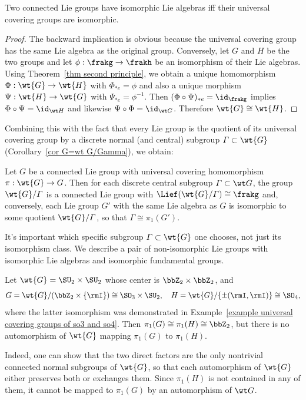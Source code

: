 \begin{thm}[{{\cite[Thm.~9.5.13]{HN}}}]
    Two connected Lie groups have isomorphic Lie algebras iff their universal covering groups are isomorphic.
\end{thm}
\begin{proof}
    The backward implication is obvious because the universal covering group has the same Lie algebra as the original group. Conversely, let $G$ and $H$ be the two groups and let $\phi:\frakg\to \frakh$ be an isomorphism of their Lie algebras. Using Theorem~\ref{thm second principle}, we obtain a unique homomorphism $\Phi:\wt{G}\to \wt{H}$ with $\Phi_{\ast e}=\phi$ and also a unique morphism $\Psi:\wt{H}\to \wt{G}$ with $\Psi_{\ast e}=\phi^{-1}$. Then $(\Phi\circ\Psi)_{\ast e}=\id_{\frakg}$ implies  $\Phi\circ\Psi=\id_{\wt H}$ and likewise $\Psi\circ\Phi=\id_{\wt G}$. Therefore $\wt{G}\cong \wt{H}$.
\end{proof}
Combining this with the fact that every Lie group is the quotient of its universal covering group by a discrete normal (and central) subgroup $\varGamma\subset \wt{G}$ (Corollary~\ref{cor G=wt G/Gamma}), we obtain:

\begin{cor}
    Let $G$ be a connected Lie group with universal covering homomorphism $\pi:\wt{G}\to G$. Then for each discrete central subgroup $\varGamma\subset \wt G$, the group $\wt{G}\slash\varGamma$ is a connected Lie group with $\Lief (\wt{G}\slash \varGamma)\cong \frakg$  and, conversely, each Lie group $G'$ with the same Lie algebra as $G$ is isomorphic to some quotient $\wt{G}\slash \varGamma$, so that $\varGamma\cong \pi_1(G')$.
\end{cor}

\begin{example}
    It's important which specific subgroup $\varGamma\subset \wt{G}$ one chooses, not just its isomorphism class.
    We describe a pair of non-isomorphic Lie groups with isomorphic Lie algebras and isomorphic fundamental groups.

    Let $\wt{G}=\SU_2\times \SU_2$ whose center is $\bbZ_2\times\bbZ_2$, and 
    \[G=\wt{G}\slash (\bbZ_2\times \{\rmI\})\cong \SO_3\times \SU_2,\quad H=\wt{G}\slash \{\pm (\rmI,\rmI)\}\cong \SO_4,\]
    where the latter isomorphism was demonstrated in Example~\ref{example universal covering groups of so3 and so4}. Then $\pi_1(G)\cong \pi_1(H)\cong \bbZ_2$, but there is no automorphism of $\wt{G}$ mapping $\pi_1(G)$ to $\pi_1(H)$.

    Indeed, one can show that the two direct factors are the only nontrivial connected normal subgroups of $\wt{G}$, so that each automorphism of $\wt{G}$ either preserves both or exchanges them. Since $\pi_1(H)$ is not contained in any of them, it cannot be mapped to $\pi_1(G)$ by an automorphism of $\wt G$.
\end{example}

